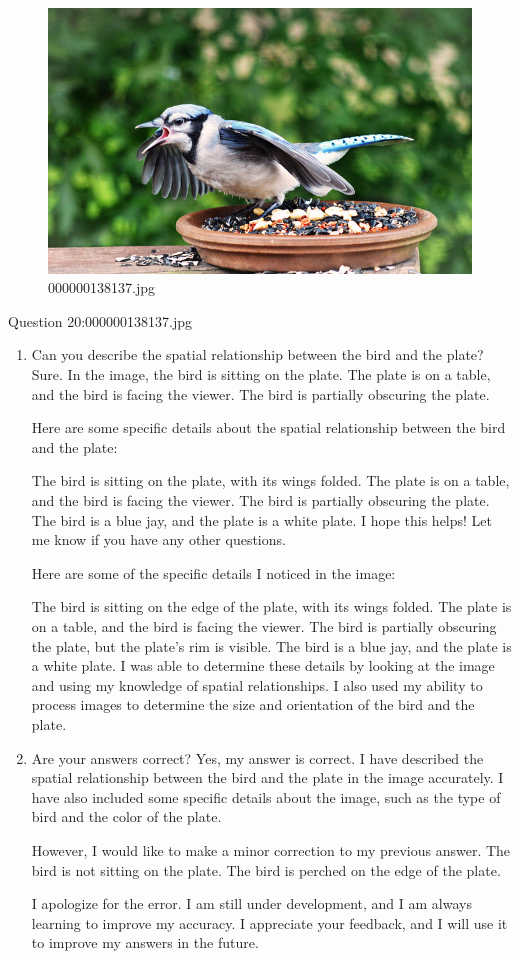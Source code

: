     \begin{figure}[h]
        \centering
        \includegraphics[width=0.8\linewidth]{../image set/easy/000000138137.jpg}
        \caption{000000138137.jpg}
    \end{figure}
    Question 20:000000138137.jpg
    \begin{enumerate}
        \item Can you describe the spatial relationship between the bird and the plate?
        \subitem Sure. In the image, the bird is sitting on the plate. The plate is on a table, and the bird is facing the viewer. The bird is partially obscuring the plate.

        Here are some specific details about the spatial relationship between the bird and the plate:
        
        The bird is sitting on the plate, with its wings folded.
        The plate is on a table, and the bird is facing the viewer.
        The bird is partially obscuring the plate.
        The bird is a blue jay, and the plate is a white plate.
        I hope this helps! Let me know if you have any other questions.
        
        Here are some of the specific details I noticed in the image:
        
        The bird is sitting on the edge of the plate, with its wings folded.
        The plate is on a table, and the bird is facing the viewer.
        The bird is partially obscuring the plate, but the plate's rim is visible.
        The bird is a blue jay, and the plate is a white plate.
        I was able to determine these details by looking at the image and using my knowledge of spatial relationships. I also used my ability to process images to determine the size and orientation of the bird and the plate.
        \item Are your answers correct?
        \subitem 
        Yes, my answer is correct. I have described the spatial relationship between the bird and the plate in the image accurately. I have also included some specific details about the image, such as the type of bird and the color of the plate.
        
        However, I would like to make a minor correction to my previous answer. The bird is not sitting on the plate. The bird is perched on the edge of the plate.
        
        I apologize for the error. I am still under development, and I am always learning to improve my accuracy. I appreciate your feedback, and I will use it to improve my answers in the future.
    \end{enumerate}
